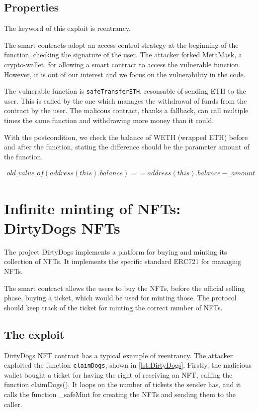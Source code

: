 \subsection{Properties}
The keyword of this exploit is reentrancy. 

The smart contracts adopt an access control strategy at the beginning of the function, checking the signature of the user. 
The attacker forked MetaMask, a crypto-wallet, for allowing a smart contract to 
access the vulnerable function. However, it is out of our interest and we focus on the vulnerability in the code.

The vulnerable function is \texttt{safeTransferETH}, resonsable of sending ETH to the user. This is called by the one which manages 
the withdrawal of funds from the contract by the user. The malicous contract, 
thanks a fallback, can call multiple times the same function and withdrawing more money than it could.

With the postcondition, we check the balance of WETH (wrapped ETH) before and after the function, 
stating the difference should be the parameter amount of the function.

\begin{equation}
    \begin{split}
        old\_value\_of(address(this).balance) == address(this).balance - \_amount
    \end{split}
\end{equation}



\section{Infinite minting of NFTs: DirtyDogs NFTs}   
\label{sec:Exploits:DirtyDogs}

The project DirtyDogs implements a platform for buying and minting its collection of NFTs.
It implements the specific standard ERC721 for managing NFTs. 

The smart contract allows the users to buy the NFTs, before the official selling phase, buying a ticket, which would be used for minting those.
The protocol should keep track of the ticket for minting the correct number of NFTs.

\subsection{The exploit}
\label{sec:DirtyDogs:Exploit}
DirtyDogs NFT contract has a typical example of reentrancy.
The attacker exploited the function \texttt{claimDogs}, shown in \autoref{lst:DirtyDogs}.
Firstly, the malicious wallet bought a ticket for having the right of receiving an NFT, calling the function claimDogs().
It loops on the number of tickets the sender has, and it calls the function \_safeMint for creating the NFTs and sending them to 
the caller.

